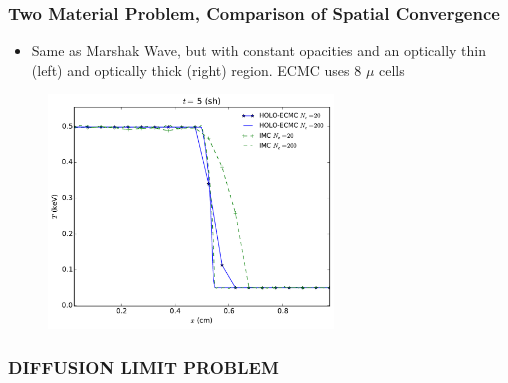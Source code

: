\documentclass[xcolor=dvipsnames,hyperref={pdfpagelabels=false},unknownkeysallowed]{beamer}
\newlength{\wideitemsep}
\let\olditem\item
\renewcommand{\item}{\setlength{\itemsep}{\wideitemsep}\olditem}
\begin{document}
{%
\begin{frame}
    \frametitle{Two Material Problem, Comparison of Spatial Convergence}
    \begin{block}{}
        \begin{itemize}
            \item Same as Marshak Wave, but with constant opacities and an optically thin (left) and
                optically thick (right) region. ECMC uses 8 $\mu$ cells
        \end{itemize}
    \end{block}
\begin{figure}
    \centering
    \includegraphics[width=0.6755799\textwidth]{two_mat_conv.pdf}
\end{figure}

\end{frame}


\begin{frame}
    \frametitle{DIFFUSION LIMIT PROBLEM}

\end{frame}

}
\end{document}

